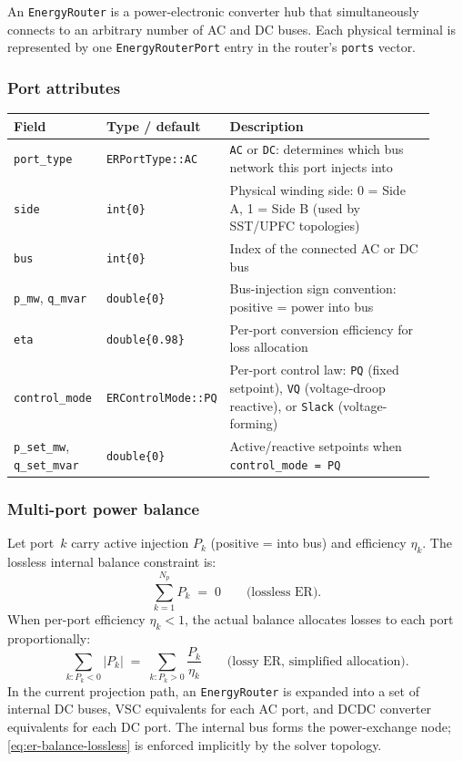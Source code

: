 An \texttt{EnergyRouter} is a power-electronic converter hub that simultaneously
connects to an arbitrary number of AC and DC buses.  Each physical terminal is
represented by one \texttt{EnergyRouterPort} entry in the router's
\texttt{ports} vector.

\subsubsection*{Port attributes}

\begin{longtable}{L{0.22\linewidth}L{0.20\linewidth}L{0.50\linewidth}}
\toprule
Field & Type / default & Description \\
\midrule
\endhead
\texttt{port\_type} & \texttt{ERPortType::AC} & \texttt{AC} or \texttt{DC}: determines which bus network this port injects into \\
\texttt{side} & \texttt{int\{0\}} & Physical winding side: 0 = Side A, 1 = Side B (used by SST/UPFC topologies) \\
\texttt{bus} & \texttt{int\{0\}} & Index of the connected AC or DC bus \\
\texttt{p\_mw}, \texttt{q\_mvar} & \texttt{double\{0\}} & Bus-injection sign convention: positive = power into bus \\
\texttt{eta} & \texttt{double\{0.98\}} & Per-port conversion efficiency for loss allocation \\
\texttt{control\_mode} & \texttt{ERControlMode::PQ} & Per-port control law: \texttt{PQ} (fixed setpoint), \texttt{VQ} (voltage-droop reactive), or \texttt{Slack} (voltage-forming) \\
\texttt{p\_set\_mw}, \texttt{q\_set\_mvar} & \texttt{double\{0\}} & Active/reactive setpoints when \texttt{control\_mode = PQ} \\
\bottomrule
\end{longtable}

\subsubsection*{Multi-port power balance}

Let port~$k$ carry active injection $P_k$ (positive = into bus) and efficiency
$\eta_k$.  The lossless internal balance constraint is:
\begin{equation}
  \sum_{k=1}^{N_p} P_k \;=\; 0 \qquad \text{(lossless ER)}.
  \label{eq:er-balance-lossless}
\end{equation}
When per-port efficiency $\eta_k < 1$, the actual balance allocates losses to
each port proportionally:
\begin{equation}
  \sum_{k : P_k < 0} |P_k| \;=\; \sum_{k : P_k > 0} \frac{P_k}{\eta_k}
  \qquad \text{(lossy ER, simplified allocation)}.
  \label{eq:er-balance-lossy}
\end{equation}
In the current projection path, an \texttt{EnergyRouter} is expanded into a
set of internal DC buses, VSC equivalents for each AC port, and DCDC converter
equivalents for each DC port.  The internal bus forms the power-exchange node;
\eqref{eq:er-balance-lossless} is enforced implicitly by the solver topology.

